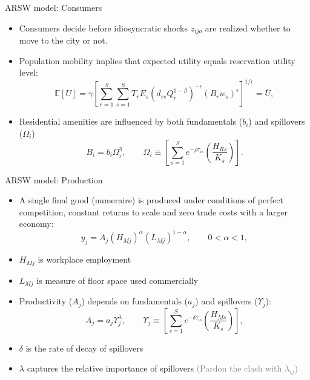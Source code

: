 \documentclass[11pt,notes=hide,aspectratio=169]{beamer}
\begin{document}
\begin{frame}{ARSW model: Consumers}
\begin{itemize}
\item Consumers decide before idiosyncratic shocks  $z_{ijo}$  are realized whether to move to the city or not.
\item Population mobility implies that expected utility equals reservation utility level:
\begin{equation*} \label{eq:pm}
\mathbb{E} \left[ U \right]  = \gamma \left[ \sum_{r=1}^{S} \sum_{s=1}^{S} T_{r} E_{s} \left( d_{rs}
Q_{r}^{1-\beta} \right)^{-\epsilon} \left( B_{r} w_{s} \right)^{\epsilon} %
\right]^{1/\epsilon} = \bar{U},  
\end{equation*}
\item Residential amenities are influenced by both fundamentals ($b_{i}$) and spillovers ($\Omega_{i}$)
\[
 B_{i} = b_{i} \Omega_{i}^{\eta}, \qquad \Omega_{i} \equiv \left[ \sum\limits_{s=1}^{S} e^{-\rho \tau_{is}} \left( \frac{H_{Rs}}{K_s} \right) \right].
\]
\end{itemize}
\end{frame}
\begin{frame}{ARSW model: Production}
\begin{itemize}
\item A single final good (numeraire) is produced under conditions of perfect competition, constant returns to scale and zero trade costs with a larger economy:
\[
y_{j} = A_{j} \left( H_{Mj} \right)^{\alpha} \left( L_{Mj} \right)^{1-\alpha},\qquad 0<\alpha <1,
\]
\item $H_{Mj}$ is workplace employment 
\item $L_{Mj}$ is measure of floor space used commercially
\item Productivity ($A_j$) depends on fundamentals ($a_j$) and spillovers ($\Upsilon_{j}$):
\[
A_{j} = a_{j} \Upsilon_{j}^{\lambda}, \qquad \Upsilon_{j} \equiv \left[ \sum\limits_{s=1}^{S} e^{-\delta \tau_{is}} \left( \frac{H_{Ms}}{K_s} \right) \right],
\]
\item $\delta$ is the rate of decay of spillovers
\item $\lambda$ captures the relative importance of spillovers
\textcolor{gray}{(Pardon the clash with $\lambda_{ij}$)}
\end{itemize}
\end{frame}
\end{document}
